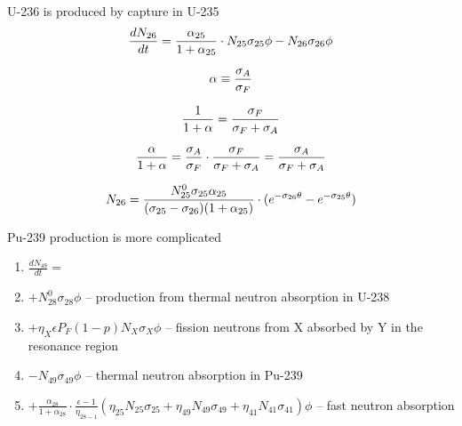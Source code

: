 \documentclass[aspectratio=1610,pdftex,dvipsnames,compress,xcolor={dvipsnames}]{beamer}
\begin{document}
\begin{frame}{U-236 is produced by capture in U-235}
    \begin{equation}
        \LARGE
        \frac{dN_{26}}{dt}=\frac{\alpha_{25}}{1 + \alpha_{25}}\cdot N_{25}\sigma_{25}\phi-N_{26}\sigma_{26}\phi
    \end{equation}
    
    \begin{equation}
        \LARGE
        \alpha \equiv \frac{\sigma_A}{\sigma_F}
    \end{equation}
    
    \begin{equation}
        \LARGE
        \frac{1}{1+\alpha} = \frac{\sigma_F}{\sigma_F+\sigma_A}
    \end{equation}

    \begin{equation}
        \LARGE
        \frac{\alpha}{1+\alpha}=\frac{\sigma_A}{\sigma_F} \cdot \frac{\sigma_F}{\sigma_F+\sigma_A} =\frac{\sigma_A}{\sigma_F+\sigma_A}
    \end{equation}

    \begin{equation}
        \LARGE
        N_{26}=\frac{N_{25}^0\sigma_{25}\alpha_{25}}{(\sigma_{25}-\sigma_{26})(1 + \alpha_{25})}\cdot(e^{-\sigma_{26}\theta}-e^{-\sigma_{25}\theta})
    \end{equation}
\end{frame}


\begin{frame}{Pu-239 production is more complicated}
    \begin{enumerate}[series=outerlist,topsep=0pt,itemsep=21pt,leftmargin=*,label=(\arabic*)]
        \item[]$\frac{dN_{49}}{dt} = $
        \item[]$+ N^0_{28}\sigma_{28}\phi$ -- production from thermal neutron absorption in U-238
        \item[]$+ \eta_{X}\epsilon P_F (1-p) N_{X}\sigma_{X}\phi$ -- fission neutrons from X absorbed by Y in the resonance region 
        \item[]$- N_{49}\sigma_{49}\phi$ -- thermal neutron absorption in Pu-239
        \item[]$+ \frac{\alpha_{28}}{1 + \alpha_{28}}\cdot\frac{\epsilon-1}{\eta_{28-1}}(\eta_{25}N_{25}\sigma_{25} + \eta_{49}N_{49}\sigma_{49} + \eta_{41}N_{41}\sigma_{41})\phi$ -- fast neutron absorption
    \end{enumerate}
\end{frame}
\end{document}
